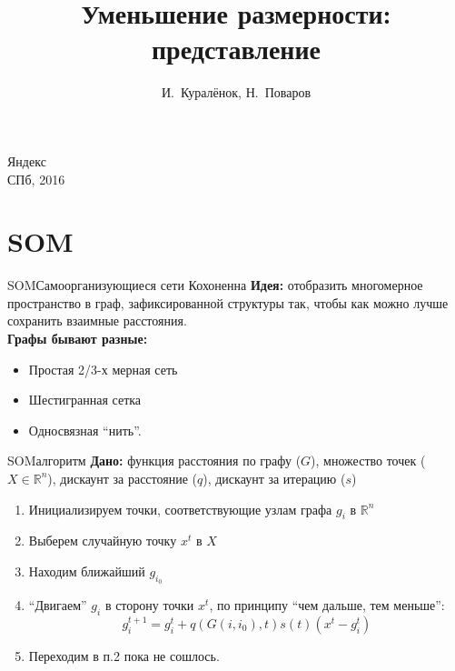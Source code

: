 \documentclass[14pt, fleqn, xcolor={dvipsnames, table}]{beamer}
\title{Уменьшение размерности: представление\\\small{}}
\author[]{\small{%
И.~Куралёнок,
Н.~Поваров}}
\date{}
\begin{document}
\begin{frame}
\maketitle
\small
\begin{center}
\vspace{-60pt}
\normalsize {\color{red}Я}ндекс \\
\vspace{80pt}
\footnotesize СПб, 2016
\end{center}
\end{frame}
\section{SOM}

\begin{frame}{SOM}{Самоорганизующиеся сети Кохоненна}
\textbf{Идея:} отобразить многомерное пространство в граф, зафиксированной структуры так, чтобы как можно лучше сохранить взаимные расстояния. \\
\textbf{Графы бывают разные:}
\begin{itemize}
  \item Простая 2/3-х мерная сеть
  \item Шестигранная сетка
  \item Односвязная “нить”.
\end{itemize}
\end{frame}

\begin{frame}{SOM}{алгоритм}
\textbf{Дано:} функция расстояния по графу ($G$), множество точек ($X \in \mathbb{R}^n$), дискаунт за расстояние ($q$), дискаунт за итерацию ($s$) 
\begin{enumerate}
  \item Инициализируем точки, соответствующие узлам графа $g_i$ в $\mathbb{R}^n$
  \item Выберем случайную точку $x^t$ в $X$
  \item Находим ближайший $g_{i_0}$
  \item ``Двигаем'' $g_i$ в сторону точки $x^t$, по принципу ``чем дальше, тем меньше'':
  $$
    g_i^{t+1} = g_i^t + q(G(i, i_0), t)s(t)(x^t - g_i^t)
  $$
  \item Переходим в п.2 пока не сошлось.
\end{enumerate}
\end{frame}
\end{document}
